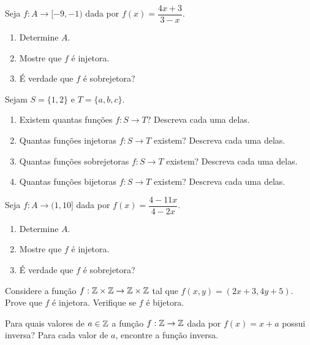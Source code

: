 \documentclass[12pt]{exam}
\begin{document}
    \vspace{.3cm}

    \questao{} Seja $f : A \to [-9,-1)$ dada por $f(x) = \dfrac{4x + 3}{3 - x}$.
    \begin{enumerate}[label={\alph*})]
        \item Determine $A$.
        \item Mostre que $f$ \'e injetora.
        \item \'E verdade que $f$ \'e sobrejetora?
    \end{enumerate}

    \vspace{.3cm}

    \questao{} Sejam $S = \{1,2\}$ e $T = \{a, b, c\}$.
    \begin{enumerate}[label={\alph*})]
        \item Existem quantas funções $f : S \to T$? Descreva cada uma delas.

        \item Quantas funções injetoras $f : S \to T$ existem? Descreva cada uma delas.


        \item Quantas funções sobrejetoras $f : S \to T$ existem? Descreva cada uma delas.

        \item Quantas funções bijetoras $f : S \to T$ existem? Descreva cada uma delas.
    \end{enumerate}

    \vspace{.3cm}

    \questao{} Seja $f : A \to (1,10]$ dada por $f(x) = \dfrac{4 - 11x}{4 - 2x}$.
    \begin{enumerate}[label={\alph*})]
        \item Determine $A$.
        \item Mostre que $f$ \'e injetora.
        \item \'E verdade que $f$ \'e sobrejetora?
    \end{enumerate}

    \vspace{.3cm}

    \questao{} Considere a fun{\c c}{\~a}o $f : \mathbb{Z} \times \mathbb{Z} \to \mathbb{Z} \times \mathbb{Z}$ tal que $f(x,y) = (2x + 3, 4y + 5)$. Prove que $f$ {\'e} injetora. Verifique se $f$ {\'e} bijetora.

    \vspace{.3cm}

    \questao{} Para quais valores de $a \in \mathbb{Z}$ a função $f : \mathbb{Z} \to \mathbb{Z}$ dada por $f(x) = x + a$ possui inversa? Para cada valor de $a$, encontre a função inversa.
\end{document}
